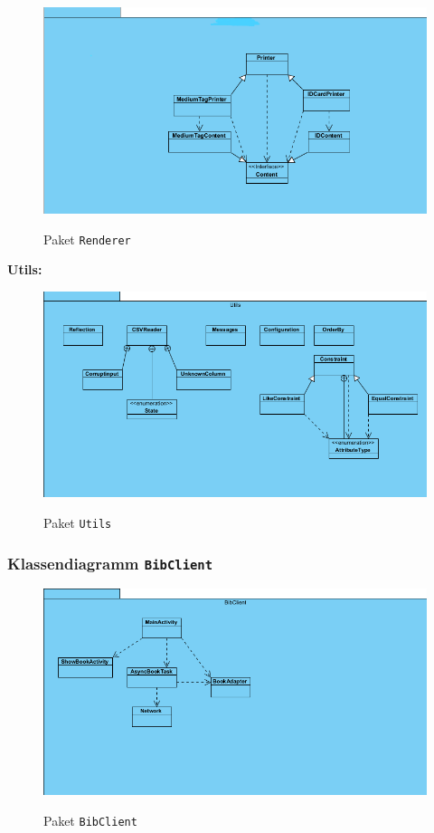 \documentclass[fontsize=12pt,paper=a4,twoside]{scrartcl}
\begin{document}
\begin{figure} [H] 
\caption{Paket \texttt{Renderer}} \centering
 \includegraphics[width=1\textwidth]{Diagramme/Renderer.png} 
 \label{Renderer} 
\end{figure}

\textbf{Utils:}

\begin{figure} [H] 
\caption{Paket \texttt{Utils}} \centering
 \includegraphics[width=1\textwidth]{Diagramme/Utils.png} 
 \label{Utils} 
\end{figure}

\subsubsection{Klassendiagramm \texttt{BibClient}}

\begin{figure} [H] 
\caption{Paket \texttt{BibClient}} \centering
 \includegraphics[width=1\textwidth]{Diagramme/bibclient.png} 
 \label{BibClient} 
\end{figure}
\end{document}

